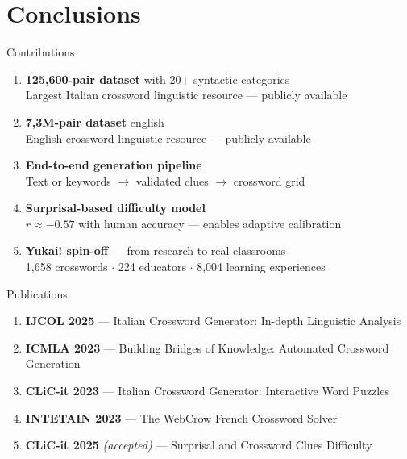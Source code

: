 \section*{Conclusions}

\begin{frame}{Contributions}
  \begin{enumerate}
    \setlength\itemsep{0.7em}
    \item \textbf{125,600-pair dataset} with 20+ syntactic categories\\
          {\scriptsize\color{graytext} Largest Italian crossword linguistic resource --- publicly available}
    
    \item \textbf{7,3M-pair dataset} english\\
          {\scriptsize\color{graytext} English crossword linguistic resource --- publicly available}

    \item \textbf{End-to-end generation pipeline}\\
          {\scriptsize\color{graytext} Text or keywords $\rightarrow$ validated clues $\rightarrow$ crossword grid}

    \item \textbf{Surprisal-based difficulty model}\\
          {\scriptsize\color{graytext} $r \approx -0.57$ with human accuracy --- enables adaptive calibration}

    \item \textbf{Yukai! spin-off} --- from research to real classrooms\\
          {\scriptsize\color{graytext} 1,658 crosswords $\cdot$ 224 educators $\cdot$ 8,004 learning experiences}
  \end{enumerate}
\end{frame}

\begin{frame}{Publications}
  \small
  \begin{enumerate}
    \setlength\itemsep{0.55em}
    \item \textbf{IJCOL 2025} --- Italian Crossword Generator: In-depth Linguistic Analysis
    \item \textbf{ICMLA 2023} --- Building Bridges of Knowledge: Automated Crossword Generation
    \item \textbf{CLiC-it 2023} --- Italian Crossword Generator: Interactive Word Puzzles
    \item \textbf{INTETAIN 2023} --- The WebCrow French Crossword Solver
    \item \textbf{CLiC-it 2025} \textit{(accepted)} --- Surprisal and Crossword Clues Difficulty
  \end{enumerate}
\end{frame}